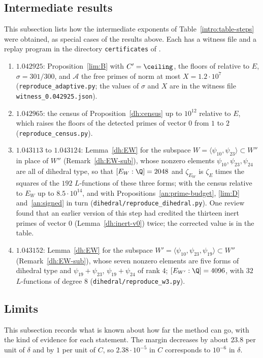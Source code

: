\subsection{Intermediate results}
This subsection lists how the intermediate exponents of
Table~\ref{intro:table-steps} were obtained, as special cases of the results
above. Each has a witness file and a replay program in the directory
\texttt{certificates} of \cite{NaslundCode4317}.
\begin{enumerate}
\item[(1)] $1.042925$: Proposition~\ref{lim:B} with $C'=\ceiling$, the
 floors of \cite{Naslund04273} relative to $E$, $\sigma=301/300$, and
 $\mathcal A$ the free primes of norm at most $X=1.2\cdot10^7$
 (\texttt{reproduce\_adaptive.py}; the values of $\sigma$ and $X$ are in the
 witness file \texttt{witness\_0.042925.json}).
\item[(2)] $1.042965$: the census of Proposition~\ref{dh:census} up to
 $10^{12}$ relative to $E$, which raises the floors of the detected primes of
 vector $0$ from $1$ to $2$ (\texttt{reproduce\_census.py}).
\item[(3)] $1.043113$ to $1.043124$: Lemma~\ref{dh:EW} for the subspace
 $W=\langle\psi_{10},\psi_{23}\rangle\subset W''$ in place of $W''$
 (Remark~\ref{dh:EW-sub}), whose nonzero elements
 $\psi_{10},\psi_{23},\psi_{24}$ are all of dihedral type, so that
 $[E_W:\Q]=2048$ and $\zeta_{E_W}$ is $\zeta_E$ times the squares of the $192$
 $L$-functions of these three forms; with the census relative to $E_W$ up to
 $8.5\cdot10^{14}$, and with Propositions~\ref{an:prime-budget}, \ref{lim:D}
 and~\ref{an:signed} in turn (\texttt{dihedral/reproduce\_dihedral.py}). One
 review found that an earlier version of this step had credited the thirteen
 inert primes of vector $0$ (Lemma~\ref{dh:inert-v0}) twice; the corrected value is in the table.
\item[(4)] $1.043152$: Lemma~\ref{dh:EW} for the subspace
 $W'=\langle\psi_{10},\psi_{23},\psi_{19}\rangle\subset W''$
 (Remark~\ref{dh:EW-sub}), whose seven nonzero elements
 are five forms of dihedral type and $\psi_{19}+\psi_{23}$,
 $\psi_{19}+\psi_{24}$ of rank $4$; $[E_{W'}:\Q]=4096$, with $32$
 $L$-functions of degree $8$ (\texttt{dihedral/reproduce\_w3.py}).
\end{enumerate}

\subsection{Limits}
This subsection records what is known about how far the method can go, with
the kind of evidence for each statement. The margin decreases by about $23.8$ per unit of $\delta$ and by $1$ per unit
of $C$, so $2.38\cdot10^{-5}$ in $C$ corresponds to $10^{-6}$ in $\delta$.

